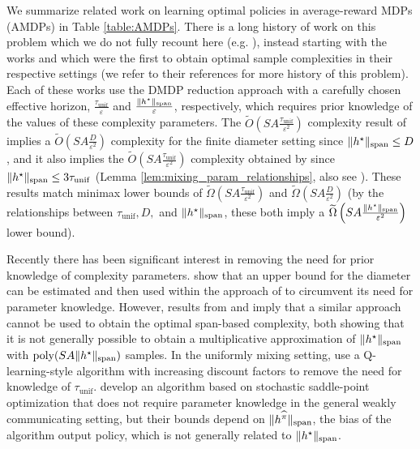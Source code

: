 \documentclass{article}
\theoremstyle{plain}
\theoremstyle{plain}
\theoremstyle{remark}
\theoremstyle{plain}
\theoremstyle{plain}
\newcommand{\pihat}{\widehat{\pi}}
\newcommand{\Otilde}{\widetilde{O}}
\newcommand{\tmix}{\tau_{\mathrm{unif}}}
\begin{document}
We summarize related work on learning optimal policies in average-reward MDPs (AMDPs) in Table \ref{table:AMDPs}.
There is a long history of work on this problem which we do not fully recount here (e.g. \cite{jin_efficiently_2020, jin_towards_2021, li_stochastic_2024, wang_near_2022, zhang_sharper_2023}), instead starting with the works \cite{wang_optimal_2023} and \cite{zurek_span-based_2025} which were the first to obtain optimal sample complexities in their respective settings (we refer to their references for more history of this problem). Each of these works use the DMDP reduction approach with a carefully chosen effective horizon, $\frac{\tmix}{\varepsilon}$ and $\frac{\Vert h^\star\Vert _{\textnormal{span}}}{\varepsilon}$, respectively, which requires prior knowledge of the values of these complexity parameters. The $\Otilde\left(SA \frac{\tmix}{\varepsilon^2} \right)$ complexity result of \cite{zurek_span-based_2025} implies a $\Otilde\left(SA\frac{D}{\varepsilon^2} \right)$ complexity for the finite diameter setting since $\Vert h^\star\Vert _{\textnormal{span}} \leq D$ \citep{bartlett_regal_2012, lattimore_bandit_2020}, and it also implies the $\Otilde\left(SA \frac{\tmix}{\varepsilon^2} \right)$ complexity obtained by \cite{wang_optimal_2023} since $\spannorm{h^\star} \leq 3 \tmix$ (Lemma \ref{lem:mixing_param_relationships}, also see \cite{wang_near_2022}). These results match minimax lower bounds of $\widetilde{\Omega}\left(SA \frac{\tmix}{\varepsilon^2} \right)$ \citep{jin_towards_2021} and $\widetilde{\Omega}\left(SA \frac{D}{\varepsilon^2} \right)$ (by the relationships between $\tmix, D,$ and $\Vert h^\star\Vert _{\textnormal{span}}$, these both imply a $\widetilde{\Omega}\left(SA \frac{\Vert h^\star\Vert _{\textnormal{span}}}{\varepsilon^2} \right)$ lower bound).

Recently there has been significant interest in removing the need for prior knowledge of complexity parameters. \cite{tuynman_finding_2024} show that an upper bound for the diameter can be estimated and then used within the approach of \cite{zurek_span-based_2025} to circumvent its need for parameter knowledge. However, results from \cite{tuynman_finding_2024} and \cite{zurek_span-based_2025} imply that a similar approach cannot be used to obtain the optimal span-based complexity, both showing that it is not generally possible to obtain a multiplicative approximation of $\Vert h^\star\Vert _{\textnormal{span}}$ with $\text{poly}(SA\Vert h^\star\Vert _{\textnormal{span}})$ samples. In the uniformly mixing setting, \cite{jin_feasible_2024} use a Q-learning-style algorithm with increasing discount factors to remove the need for knowledge of $\tmix$. \cite{neu_dealing_2024} develop an algorithm based on stochastic saddle-point optimization that does not require parameter knowledge in the general weakly communicating setting, but their bounds depend on $\spannorm{h^{\pihat}}$, the bias of the algorithm output policy, which is not generally related to $\Vert h^\star\Vert _{\textnormal{span}}$.
\end{document}
